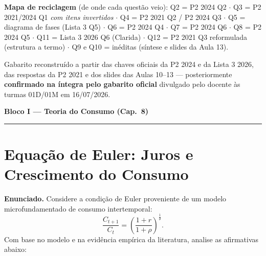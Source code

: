 \documentclass[12pt, a4paper]{article}
\begin{document}
\begin{titlepage}
\begin{center}
\vspace{1.2em}
\begin{tcolorbox}[standard, colback=boxbg, colframe=boxborder, width=0.88\textwidth,
  arc=4pt, boxrule=1pt, left=8pt, right=8pt, top=5pt, bottom=5pt]
\raggedright\small
\textbf{Mapa de reciclagem} (de onde cada questão veio):
Q2 = P2 2024 Q2 $\cdot$ Q3 = P2 2021/2024 Q1 \emph{com itens invertidos}
$\cdot$ Q4 = P2 2021 Q2 / P2 2024 Q3 $\cdot$ Q5 = diagrama de fases (Lista 3
Q5) $\cdot$ Q6 = P2 2024 Q4 $\cdot$ Q7 = P2 2024 Q6 $\cdot$ Q8 = P2 2024 Q5
$\cdot$ Q11 = Lista 3 2026 Q6 (Clarida) $\cdot$ Q12 = P2 2021 Q3 reformulada
(estrutura a termo) $\cdot$ Q9 e Q10 = inéditas (síntese e slides da Aula 13).
\end{tcolorbox}

\vfill
{\small Gabarito reconstruído a partir das chaves oficiais da P2 2024 e da
Lista 3 2026, das respostas da P2 2021 e dos slides das Aulas 10--13 ---
posteriormente \textbf{confirmado na íntegra pelo gabarito oficial} divulgado
pelo docente às turmas 01D/01M em 16/07/2026.}
\end{center}
\end{titlepage}

\begin{center}
{\large\bfseries\color{cyanrbc} Bloco I --- Teoria do Consumo (Cap.\ 8)}\\[0.2em]
\rule{\linewidth}{0.6pt}
\end{center}

\setcounter{section}{0}

\section{Equação de Euler: Juros e Crescimento do Consumo}

\textbf{Enunciado.} Considere a condição de Euler proveniente de um modelo
microfundamentado de consumo intertemporal:
\[
\frac{C_{t+1}}{C_t} = \left(\frac{1+r}{1+\rho}\right)^{\frac{1}{\theta}}.
\]
Com base no modelo e na evidência empírica da literatura, analise as
afirmativas abaixo:
\end{document}
